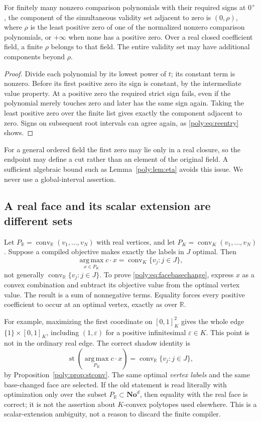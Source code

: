 \documentclass[11pt,a4paper]{article}
\numberwithin{equation}{section}
\theoremstyle{plain}
\newcommand{\No}{\mathbf{No}}
\newcommand{\R}{\mathbb R}
\newcommand{\eps}{\varepsilon}
\newcommand{\st}{\operatorname{st}}
\newcommand{\conv}{\operatorname{conv}}
\begin{document}
\begin{proposition}\label{poly:prop:radius}
For finitely many nonzero comparison polynomials with their required
signs at $0^+$, the component of the simultaneous validity set adjacent
to zero is $(0,\rho)$, where $\rho$ is the least positive zero of one
of the normalized nonzero comparison polynomials, or $+\infty$ when
none has a positive zero. Over a real closed coefficient field, a finite
$\rho$ belongs to that field. The entire validity set may have additional
components beyond $\rho$.
\end{proposition}
\begin{proof}
Divide each polynomial by its lowest power of $t$; its constant term is
nonzero. Before its first positive zero its sign is constant, by the
intermediate value property. At a positive zero the required strict sign
fails, even if the polynomial merely touches zero and later has the same
sign again. Taking the least positive zero over the finite list gives
exactly the component adjacent to zero. Signs on subsequent root intervals
can agree again, as \eqref{poly:eq:reentry} shows.
\end{proof}

For a general ordered field the first zero may lie only in a real closure,
so the endpoint may define a cut rather than an element of the original
field. A sufficient algebraic bound such as Lemma~\ref{poly:lem:eta} avoids
this issue. We never use a global-interval assertion.

\subsection{A real face and its scalar extension are different sets}

Let $P_{\R}=\conv_{\R}(v_1,\ldots,v_N)$ with real vertices, and let
$P_K=\conv_K(v_1,\ldots,v_N)$. Suppose a compiled objective makes exactly
the labels in $J$ optimal. Then
\begin{equation}\label{poly:eq:facebasechange}
 \operatorname*{arg\,max}_{x\in P_K}c\cdot x
   =\conv_K\{v_j:j\in J\},
\end{equation}
not generally $\conv_{\R}\{v_j:j\in J\}$.
To prove \eqref{poly:eq:facebasechange}, express $x$ as a convex combination
and subtract its objective value from the optimal vertex value. The result
is a sum of nonnegative terms. Equality forces every positive coefficient
to occur at an optimal vertex, exactly as over $\R$.

For example, maximizing the first coordinate on $[0,1]^2_K$ gives the
whole edge $\{1\}\times[0,1]_K$, including $(1,\eps)$ for a positive
infinitesimal $\eps\in K$. This point is not in the ordinary real edge.
The correct shadow identity is
\[
 \st\!\left(\operatorname*{arg\,max}_{P_K}c\cdot x\right)
   =\conv_{\R}\{v_j:j\in J\},
\]
by Proposition~\ref{poly:prop:stconv}. The same optimal \emph{vertex labels}
and the same base-changed face are selected. If the old statement is read
literally with optimization only over the subset $P_{\R}\subset\No^d$,
then equality with the real face is correct; it is not the assertion about
$K$-convex polytopes used elsewhere. This is a scalar-extension ambiguity,
not a reason to discard the finite compiler.
\end{document}
